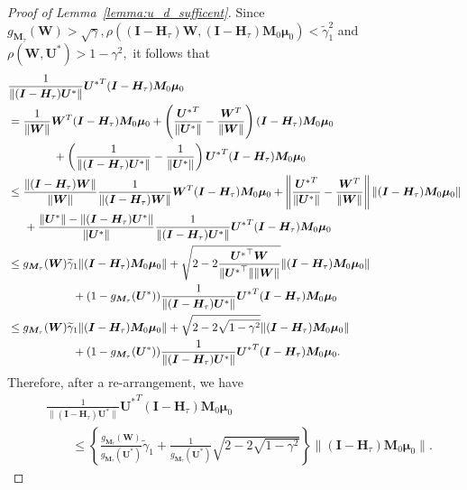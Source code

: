 \documentclass[12pt]{article}
\theoremstyle{shortspace}
\def\*#1{\bm{#1}}
\begin{document}
\begin{proof}[Proof of Lemma~\ref{lemma:u_d_sufficent}]
 Since $g_{\*M_\tau}(\*W) > \sqrt{\gamma}, \rho((\*I - \*H_\tau)\*W, (\*I - \*H_\tau)\*M_0\*\mu_0)< \widetilde \gamma_1^2$ and $\rho(\*W, \*U^*) > 1-\gamma^2,$ it follows that
\begin{align*}
     & \frac{1}{\|(\*I - \*H_\tau){\*U^*}\|}{\*U^*}^{T}(\*I - \*H_\tau)\*M_0\*\mu_0\\ 
     & =   \frac{1}{\|\*W\|} \*W^T(\*I - \*H_\tau)\*M_0\*\mu_0 + \left(\frac{{\*U^*}^T}{\|{\*U^*}\|}-\frac{\*W^T}{\|\*W\|}\right)(\*I - \*H_\tau)\*M_0\*\mu_0   \\& \qquad \qquad  +  \left(\frac{1}{\|(\*I - \*H_\tau){\*U^*}\|}-\frac{1}{\|{\*U^*}\|}\right){\*U^*}^T(\*I - \*H_\tau)\*M_0\*\mu_0\\
     & \leq \frac{\|(\*I - \*H_\tau)\*W\|}{\|\*W\|}\frac{1}{\|(\*I - \*H_\tau)\*W\|}\*W^T(\*I - \*H_\tau)\*M_0\*\mu_0   +  \left\|\frac{{\*U^*}^T}{\|{\*U^*}\|}-\frac{\*W^T}{\|\*W\|}\right\|\|(\*I - \*H_\tau)\*M_0\*\mu_0\| \\
     &  \hspace{0.5cm} + \frac{\|{\*U^*}\|-\|(\*I - \*H_\tau){\*U^*}\|}{\|{\*U^*}\|}\frac{1}{\|(\*I - \*H_\tau){\*U^*}\|}{\*U^*}^T(\*I - \*H_\tau)\*M_0\*\mu_0 \\
     &  \leq g_{\*M_\tau}(\*W)\widetilde\gamma_1\|(\*I - \*H_\tau)\*M_0\*\mu_0 \|  +  \sqrt{2-2\frac{{\*U^*}^\top \*W}{\|{\*U^*}^\top\| \|\*W\|}}\|(\*I - \*H_\tau)\*M_0\*\mu_0\| \\ 
     & \hspace{2cm} +(1-g_{\*M_\tau}({\*U^*}))\frac{1}{\|(\*I - \*H_\tau){\*U^*}\|}{\*U^*}^T(\*I - \*H_\tau)\*M_0\*\mu_0\\
     &   \leq g_{\*M_\tau}(\*W) \widetilde\gamma_1\|(\*I - \*H_\tau)\*M_0\*\mu_0 \|  +  \sqrt{2-2\sqrt{1-\gamma^2}}\|(\*I - \*H_\tau)\*M_0\*\mu_0\|\\
     & \hspace{2cm}+ (1-g_{\*M_\tau}({\*U^*}))\frac{1}{\|(\*I - \*H_\tau){\*U^*}\|}{\*U^*}^T(\*I - \*H_\tau)\*M_0\*\mu_0.
\end{align*}
Therefore, after a re-arrangement, we have 
\begin{align}
\label{eq:ABC}
    &  \frac{1}{\|(\*I - \*H_\tau){\*U^*}\|}{\*U^*}^T(\*I - \*H_\tau)\*M_0\*\mu_0 \nonumber
    \\     &  \qquad 
    \leq  \left\{\frac{g_{\*M_\tau}(\*W)}{g_{\*M_\tau}({\*U^*})} \widetilde\gamma_1
    + \frac{1}{g_{\*M_\tau}({\*U^*})} \sqrt{2-2\sqrt{1-\gamma^2}}\right\}\|(\*I - \*H_\tau)\*M_0\*\mu_0\|.

\end{align}
\end{proof}
\end{document}
